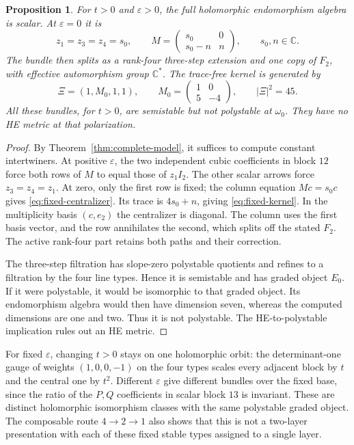 \documentclass[11pt]{amsart}
\newtheorem{proposition}[theorem]{Proposition}
\theoremstyle{definition}
\theoremstyle{remark}
\newcommand{\CC}{\mathbb C}
\begin{document}
\begin{proposition}\label{prop:fixed-centralizer}
For $t>0$ and $\varepsilon>0$, the full holomorphic endomorphism algebra
is scalar. At $\varepsilon=0$ it is
\begin{equation}\label{eq:fixed-centralizer}
 z_1=z_3=z_4=s_0,\qquad
 M=\begin{pmatrix}s_0&0\\s_0-n&n\end{pmatrix},\qquad s_0,n\in\CC.
\end{equation}
The bundle then splits as a rank-four three-step extension and one copy
of $F_2$, with effective automorphism group $\CC^*$. The trace-free
kernel is generated by
\begin{equation}\label{eq:fixed-kernel}
 \Xi=(1,M_0,1,1),\qquad M_0=\begin{pmatrix}1&0\\5&-4\end{pmatrix},
 \qquad |\Xi|^2=45.
\end{equation}
All these bundles, for $t>0$, are semistable but not polystable at
$\omega_0$. They have no HE metric at that polarization.
\end{proposition}
\begin{proof}
By Theorem~\ref{thm:complete-model}, it suffices to compute constant
intertwiners. At positive $\varepsilon$, the two independent cubic
coefficients in block $12$ force both rows of $M$ to equal those of
$z_1I_2$. The other scalar arrows force $z_3=z_4=z_1$.
At zero, only the first row is fixed; the column equation $Mc=s_0c$
gives \eqref{eq:fixed-centralizer}. Its trace is $4s_0+n$, giving
\eqref{eq:fixed-kernel}. In the multiplicity basis $(c,e_2)$ the
centralizer is diagonal. The column uses the first basis vector, and
the row annihilates the second, which splits off the stated $F_2$.
The active rank-four part retains both paths and their correction.

The three-step filtration has slope-zero polystable quotients and
refines to a filtration by the four line types. Hence it is semistable
and has graded object $E_0$. If it were polystable, it would be
isomorphic to that graded object. Its endomorphism algebra would then
have dimension seven, whereas the computed dimensions are one and two.
Thus it is not polystable. The HE-to-polystable implication
\cite[Theorem 5.8.3]{Kobayashi87} rules out an HE metric.
\end{proof}

For fixed $\varepsilon$, changing $t>0$ stays on one holomorphic
orbit: the determinant-one gauge of weights $(1,0,0,-1)$ on the
four types scales every adjacent block by $t$ and the central one
by $t^2$. Different $\varepsilon$ give different bundles over the
fixed base, since the ratio of the $P,Q$ coefficients in scalar
block $13$ is invariant. These are distinct holomorphic isomorphism
classes with the same polystable graded object. The composable route
$4\to2\to1$ also shows that this is not a two-layer presentation
with each of these fixed stable types assigned to a single layer.
\end{document}
